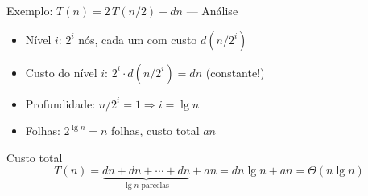 \documentclass[aspectratio=169]{beamer}
\newcommand{\impt}[1]{\textcolor{maccent}{\textbf{#1}}}
\begin{document}
\begin{frame}{Exemplo: $T(n) = 2\,T(n/2) + dn$ --- Análise}
\begin{itemize}
    \item Nível $i$: $2^i$ nós, cada um com custo $d(n/2^i)$
    \item Custo do nível $i$: $2^i \cdot d(n/2^i) = dn$ \quad (constante!)
    \pause
    \item Profundidade: $n/2^i = 1 \Rightarrow i = \lg n$
    \item Folhas: $2^{\lg n} = n$ folhas, custo total $an$
\end{itemize}

\vspace{0.3cm}
\pause

\begin{alertblock}{Custo total}
\[
T(n) = \underbrace{dn + dn + \cdots + dn}_{\lg n \text{ parcelas}} + an = dn\lg n + an = \Theta(n\lg n)
\]
\end{alertblock}
\end{frame}




\end{document}
